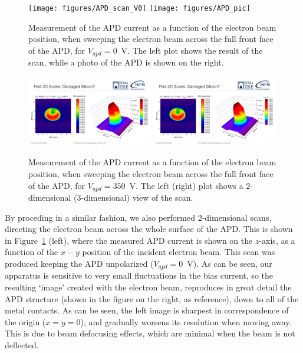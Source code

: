 \documentclass[12p]{paper}
\begin{document}
\begin{figure}[p]
  \centering
\texttt{[image: figures/APD\_scan\_V0]}
\texttt{[image: figures/APD\_pic]}
 \caption{Measurement of the APD current as a function of the electron beam position, when sweeping the electron beam across the full front face of the APD, for $V_{apd} = 0$~V. The left plot shows the result of the scan, while a photo of the APD is shown on the right.
  \label{fig:2d_scan_V0}}
\end{figure}
\begin{figure}[p]
  \centering
\includegraphics[width=0.49\textwidth]{figures/APD_scan_V350}
\includegraphics[width=0.49\textwidth]{figures/APD_scan_V350_3d}
 \caption{Measurement of the APD current as a function of the electron beam position, when sweeping the electron beam across the full front face of the APD, for $V_{apd} = 350$~V. The left (right) plot shows a 2-dimensional (3-dimensional) view of the scan.
  \label{fig:2d_scan_V350}}
\end{figure}

By proceding in a similar fashion, we also performed 2-dimensional scans, directing the electron beam across the whole surface of the APD. This is shown in Figure~\ref{fig:2d_scan_V0} (left), where the measured APD current is shown on the $z$-axis, as a function of the $x-y$ position of the incident electron beam. This scan was produced keeping the APD unpolarized ($V_{apd} = 0$~V). As can be seen, our apparatus is sensitive to very small fluctuations in the bias current, so the resulting `image' created with the electron beam, reproduces in great detail the APD structure (shown in the figure on the right, as reference), down to all of the metal contacts. As can be seen, the left image is sharpest in correspondence of the origin ($x=y=0$), and gradually worsens its resolution when moving away. This is due to beam defocusing effects, which are minimal when the beam is not deflected.
\end{document}
